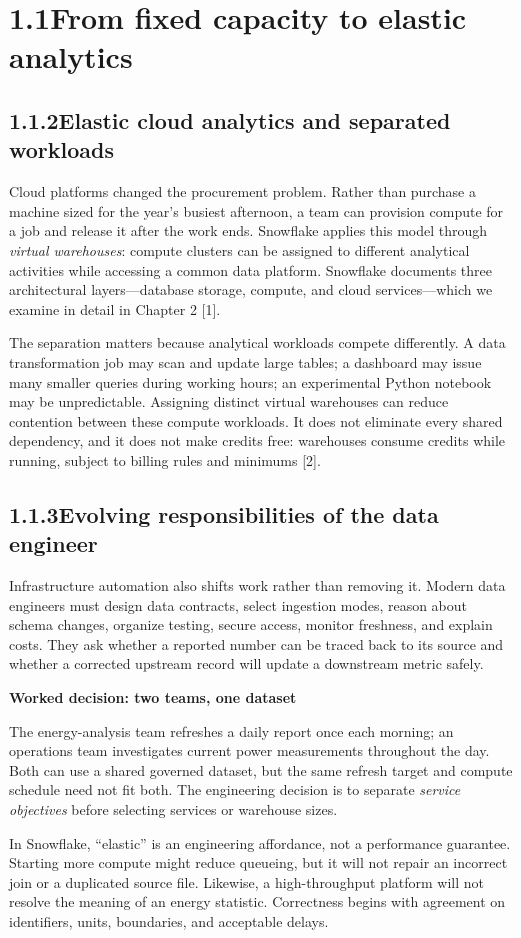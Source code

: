 \documentclass[11pt,twoside]{article}
\newcommand{\topic}[2]{\subsection*{#1\quad #2}}
\begin{document}
\section*{1.1\quad From fixed capacity to elastic analytics}
\topic{1.1.2}{Elastic cloud analytics and separated workloads}
Cloud platforms changed the procurement problem. Rather than purchase a machine sized for the year's busiest afternoon, a team can provision compute for a job and release it after the work ends. Snowflake applies this model through \emph{virtual warehouses}: compute clusters can be assigned to different analytical activities while accessing a common data platform. Snowflake documents three architectural layers---database storage, compute, and cloud services---which we examine in detail in Chapter 2 [1].

The separation matters because analytical workloads compete differently. A data transformation job may scan and update large tables; a dashboard may issue many smaller queries during working hours; an experimental Python notebook may be unpredictable. Assigning distinct virtual warehouses can reduce contention between these compute workloads. It does not eliminate every shared dependency, and it does not make credits free: warehouses consume credits while running, subject to billing rules and minimums [2].

\topic{1.1.3}{Evolving responsibilities of the data engineer}
Infrastructure automation also shifts work rather than removing it. Modern data engineers must design data contracts, select ingestion modes, reason about schema changes, organize testing, secure access, monitor freshness, and explain costs. They ask whether a reported number can be traced back to its source and whether a corrected upstream record will update a downstream metric safely.

\begin{insight}
\textbf{Worked decision: two teams, one dataset}\par
The energy-analysis team refreshes a daily report once each morning; an operations team investigates current power measurements throughout the day. Both can use a shared governed dataset, but the same refresh target and compute schedule need not fit both. The engineering decision is to separate \emph{service objectives} before selecting services or warehouse sizes.
\end{insight}

In Snowflake, ``elastic'' is an engineering affordance, not a performance guarantee. Starting more compute might reduce queueing, but it will not repair an incorrect join or a duplicated source file. Likewise, a high-throughput platform will not resolve the meaning of an energy statistic. Correctness begins with agreement on identifiers, units, boundaries, and acceptable delays.
\end{document}
